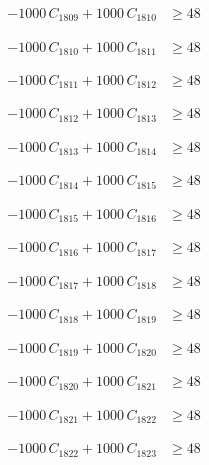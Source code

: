 \documentclass[a4paper,11pt]{article}
\begin{document}
\begin{align}
-1000\,C_{1809} + 1000\,C_{1810} &\geq 48 \nonumber
\end{align}

\begin{align}
-1000\,C_{1810} + 1000\,C_{1811} &\geq 48 \nonumber
\end{align}

\begin{align}
-1000\,C_{1811} + 1000\,C_{1812} &\geq 48 \nonumber
\end{align}

\begin{align}
-1000\,C_{1812} + 1000\,C_{1813} &\geq 48 \nonumber
\end{align}

\begin{align}
-1000\,C_{1813} + 1000\,C_{1814} &\geq 48 \nonumber
\end{align}

\begin{align}
-1000\,C_{1814} + 1000\,C_{1815} &\geq 48 \nonumber
\end{align}

\begin{align}
-1000\,C_{1815} + 1000\,C_{1816} &\geq 48 \nonumber
\end{align}

\begin{align}
-1000\,C_{1816} + 1000\,C_{1817} &\geq 48 \nonumber
\end{align}

\begin{align}
-1000\,C_{1817} + 1000\,C_{1818} &\geq 48 \nonumber
\end{align}

\begin{align}
-1000\,C_{1818} + 1000\,C_{1819} &\geq 48 \nonumber
\end{align}

\begin{align}
-1000\,C_{1819} + 1000\,C_{1820} &\geq 48 \nonumber
\end{align}

\begin{align}
-1000\,C_{1820} + 1000\,C_{1821} &\geq 48 \nonumber
\end{align}

\begin{align}
-1000\,C_{1821} + 1000\,C_{1822} &\geq 48 \nonumber
\end{align}

\begin{align}
-1000\,C_{1822} + 1000\,C_{1823} &\geq 48 \nonumber
\end{align}
\end{document}
